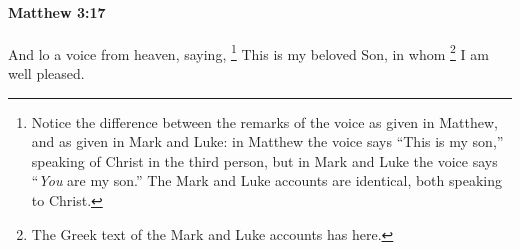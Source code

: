 			\begin{framed}
			\scriptsize
				\begin{compactdesc}
					\item[SBLG] 
				\end{compactdesc}
			\end{framed}

		\paragraph{Matthew 3:17} %
			\label{MATTHEW-3-17}

			And lo a voice from heaven, saying,%
				\footnote{%
					Notice the difference between the remarks of the voice as given in Matthew, and as given in Mark and Luke: in Matthew the voice says ``This is my son,'' speaking of Christ in the third person, but in Mark and Luke the voice says ``\textit{You} are my son.'' The Mark and Luke accounts are identical, both speaking to Christ. 
					} 
			This is my beloved Son, in whom%
				\footnote{%
					The Greek text of the Mark and Luke accounts has  here.
					}
			I am well pleased.

